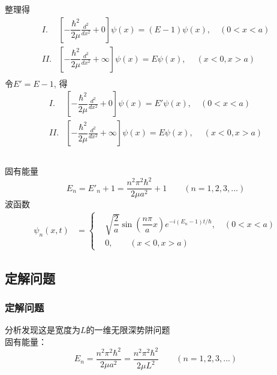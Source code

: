 \begin{frame}
  \frametitle{}
  整理得
  \[\begin{aligned}
	I. &\left [ -\dfrac{\hbar^2}{2\mu } \frac{d^2 }{d x^2} + 0 \right ]\psi(x)  = (E-1) \psi(x), \quad (0 < x < a) \\
	II. &\left [ -\dfrac{\hbar^2}{2\mu } \frac{d^2 }{d x^2} + \infty \right ]\psi(x)  = E \psi(x) ,\quad~ ( x < 0, x > a) \\
\end{aligned}\]
令$E'=E-1$, 得
\[\begin{aligned}
	I. &\left [ -\dfrac{\hbar^2}{2\mu } \frac{d^2 }{d x^2} + 0 \right ]\psi(x)  = E' \psi(x), \quad (0 < x < a) \\
	II. &\left [ -\dfrac{\hbar^2}{2\mu } \frac{d^2 }{d x^2} + \infty \right ]\psi(x)  = E \psi(x) ,\quad~ ( x < 0, x > a) \\
\end{aligned}\]
\end{frame} 

\begin{frame}
  \frametitle{}
固有能量
\[E_n = E'_n +1 = \dfrac{n^2\pi^2\hbar^2}{2\mu a^2} +1 \qquad (n=1,2,3,...) \]
波函数
\[ \begin{aligned}
	\psi _n (x,t)&=\left\{
	\begin{aligned}
		& \sqrt{\dfrac{2}{a}}\sin(\dfrac{n\pi}{a}x) e^{-i(E_n-1)t/\hbar}, \quad (0 < x < a) \\ 
		& 0, \quad \quad ( x < 0, x > a)
	\end{aligned} \right. 
\end{aligned} 
	\]
\end{frame} 

\subsection{定解问题}
\begin{frame}
	\frametitle{定解问题}
	\解 分析发现这是宽度为$L$的一维无限深势阱问题\\ 	
	固有能量：
	\[E_n = \dfrac{n^2\pi^2\hbar^2}{2\mu a^2} = \dfrac{n^2\pi^2\hbar^2}{2\mu L^2}  \qquad (n=1,2,3,...) \]
\end{frame}

